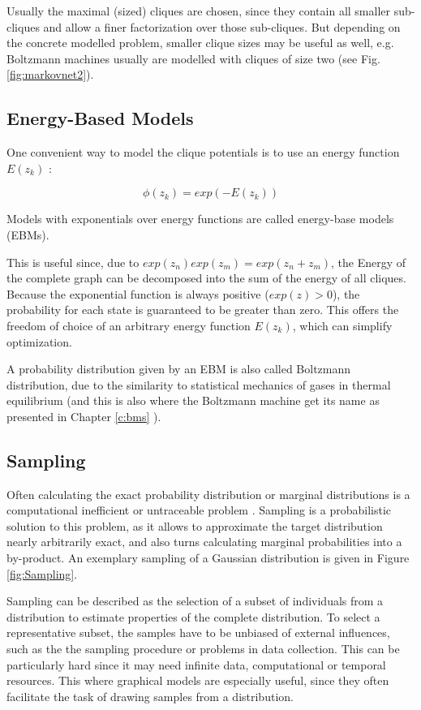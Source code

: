 Usually the maximal (sized) cliques are chosen, since they contain all smaller sub-cliques and allow a finer factorization over those sub-cliques.
But depending on the concrete modelled problem, smaller clique sizes may be useful as well, e.g. Boltzmann machines usually are modelled with cliques of size two (see Fig. \ref{fig:markovnet2}).




\subsection{Energy-Based Models} \label{c:ebms}

One convenient way to model the clique potentials is to use an energy function $E(z_k)$ \cite{Goodfellow-et-al-2016-Book}: 

\[
\phi(z_k) = exp(- E(z_k))
\]

Models with exponentials over energy functions are called energy-base models (EBMs).

This is useful since, due to $exp(z_n)exp(z_m) = exp(z_n+z_m)$, the Energy of the complete graph can be decomposed into the sum of the energy of all cliques.
Because the exponential function is always positive ($exp(z) > 0$), the probability for each state is guaranteed to be greater than zero. 
This offers the freedom of choice of an arbitrary energy function $E(z_k)$, which can simplify optimization. 

A probability distribution given by an EBM is also called Boltzmann distribution, due to the similarity to statistical mechanics of gases in thermal equilibrium (and this is also where the Boltzmann machine get its name as presented in Chapter \ref{c:bms} ).

\subsection{Sampling} \label{c:sampling}

Often calculating the exact probability distribution or marginal distributions is a computational inefficient or untraceable problem \cite{Goodfellow-et-al-2016-Book} \cite{Petrovici2016}.
Sampling is a probabilistic solution to this problem, as it allows to approximate the target distribution nearly arbitrarily exact, and also turns calculating marginal probabilities into a by-product.  
An exemplary sampling of a Gaussian distribution is given in Figure \ref{fig:Sampling}.

Sampling can be described as the selection of a subset of individuals from a distribution to estimate properties of the complete distribution.
To select a representative subset, the samples have to be unbiased of external influences, such as the the sampling procedure or problems in data collection.
This can be particularly hard since it may need infinite data, computational or temporal resources.
This where graphical models are especially useful, since they often facilitate the task of drawing samples from a distribution.

